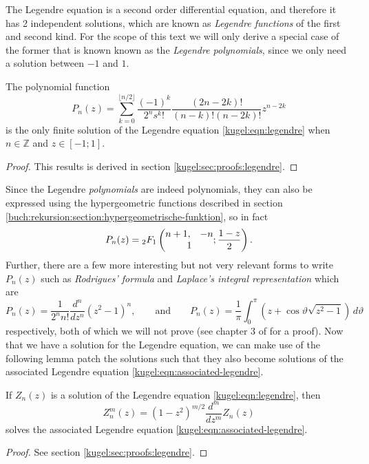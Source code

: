 The Legendre equation is a second order differential equation, and therefore it
has 2 independent solutions, which are known as \emph{Legendre functions} of the
first and second kind. For the scope of this text we will only derive a special
case of the former that is known known as the \emph{Legendre polynomials}, since
we only need a solution between $-1$ and $1$.

\begin{lemma}
  \label{kugel:thm:legendre-poly}
  The polynomial function
  \[
    P_n(z) = \sum^{\lfloor n/2 \rfloor}_{k=0}
      \frac{(-1)^k}{2^n s^k!} \frac{(2n - 2k)!}{(n - k)! (n-2k)!} z^{n - 2k}
  \]
  is the only finite solution of the Legendre equation
  \eqref{kugel:eqn:legendre} when $n \in \mathbb{Z}$ and $z \in [-1; 1]$.
\end{lemma}
\begin{proof}
  This results is derived in section \ref{kugel:sec:proofs:legendre}.
\end{proof}

Since the Legendre \emph{polynomials} are indeed polynomials, they can also be
expressed using the hypergeometric functions described in section
\ref{buch:rekursion:section:hypergeometrische-funktion}, so in fact
\begin{equation}
  P_n(z) = {}_2F_1 \left( \begin{matrix}
    n + 1, & -n \\ \multicolumn{2}{c}{1}
  \end{matrix} ; \frac{1 - z}{2} \right).
\end{equation}
Further, there are a few more interesting but not very relevant forms to write
$P_n(z)$ such as \emph{Rodrigues' formula} and \emph{Laplace's integral
representation} which are
\begin{equation*}
  P_n(z) = \frac{1}{2^n n!} \frac{d^n}{dz^n} (z^2 - 1)^n,
  \qquad \text{and} \qquad
  P_n(z) = \frac{1}{\pi} \int_0^\pi \left(
    z + \cos\vartheta \sqrt{z^2 - 1}
  \right) \, d\vartheta
\end{equation*}
respectively, both of which we will not prove (see chapter 3 of
\cite{bell_special_2004} for a proof). Now that we have a solution for the
Legendre equation, we can make use of the following lemma patch the solutions
such that they also become solutions of the associated Legendre equation
\eqref{kugel:eqn:associated-legendre}.

\begin{lemma} \label{kugel:thm:extend-legendre}
  If $Z_n(z)$ is a solution of the Legendre equation \eqref{kugel:eqn:legendre},
  then
  \begin{equation*}
    Z^m_n(z) = (1 - z^2)^{m/2} \frac{d^m}{dz^m}Z_n(z)
  \end{equation*}
  solves the associated Legendre equation \eqref{kugel:eqn:associated-legendre}.
  \nocite{bell_special_2004}
\end{lemma}
\begin{proof}
  See section \ref{kugel:sec:proofs:legendre}.
\end{proof}

